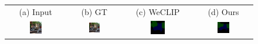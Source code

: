 \begin{figure}[ht]
  \begin{tabular}{cccc}
    (a) Input & (b) GT & (c) WeCLIP & (d) Ours         \\
    [1mm]

    \includegraphics[width=0.22\textwidth]
    {figures/originals/2007_003778.jpg}
              &
    \includegraphics[width=0.22\textwidth]
    {figures/originals/2007_003778.jpg}
              &
    \includegraphics[width=0.22\textwidth]
    {figures/val_labels/weclip/2007_003778_[7, 15].png}
              &
    \includegraphics[width=0.22\textwidth]
    {figures/val_labels/ours/2007_003778_[7, 15].png}  \\


\end{tabular}
\end{figure}
